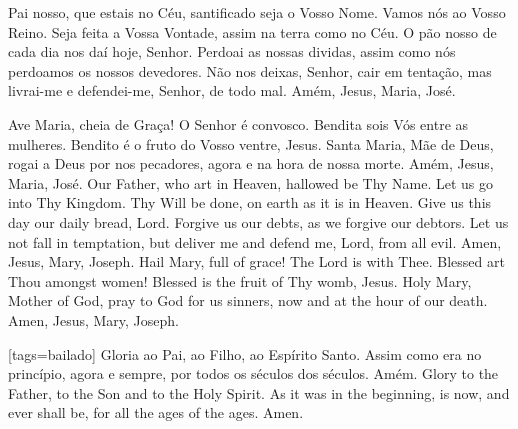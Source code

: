 {\begin{songs}{}
      \beginverse
        \subtitle{Pai nosso}
        Pai nosso,
        que estais no Céu,
        santificado seja o Vosso Nome.
        Vamos nós ao Vosso Reino.
        Seja feita a Vossa Vontade,
        assim na terra como no Céu.
        O pão nosso de cada dia nos daí hoje, Senhor.
        Perdoai as nossas dividas,
        assim como nós perdoamos os nossos devedores.
        Não nos deixas, Senhor, cair em tentação,
        mas livrai-me e defendei-me, Senhor,
        de todo mal.
        \parspace
        Amém, Jesus, Maria, José.
      \endverse
      \beginverse
        \subtitle{Ave Maria}
        Ave Maria,
        cheia de Graça!
        O Senhor é convosco.
        Bendita sois Vós entre as mulheres.
        Bendito é o fruto do Vosso ventre, Jesus.
        Santa Maria, Mãe de Deus,
        rogai a Deus por nos pecadores,
        agora e na hora de nossa morte.
        \parspace
        Amém, Jesus, Maria, José.
      \endverse
      \brk
      \vspace*{\fill}\vspace{-1em}
      \beginverse
        Our Father,
        who art in Heaven,
        hallowed be Thy Name.
        Let us go into Thy Kingdom.
        Thy Will be done,
        on earth as it is in Heaven.
        Give us this day our daily bread, Lord.
        Forgive us our debts,
        as we forgive our debtors.
        Let us not fall in temptation,
        but deliver me and defend me, Lord,
        from all evil.
        \parspace
        Amen, Jesus, Mary, Joseph.
      \endverse
      \beginverse
        Hail Mary,
        full of grace!
        The Lord is with Thee.
        Blessed art Thou amongst women!
        Blessed is the fruit of Thy womb, Jesus.
        Holy Mary, Mother of God,
        pray to God for us sinners,
        now and at the hour of our death.
        \parspace
        Amen, Jesus, Mary, Joseph.
      \endverse
      \vfill
    \endsong


    [tags={bailado}]
      \beginverse
        \parspace
        Gloria ao Pai, ao Filho, ao Espírito Santo.
        Assim como era no princípio, agora e sempre,
        por todos os séculos dos séculos.
        \parspace
        Amém.
      \endverse
      \beginverse
        \parspace
        Glory to the Father, to the Son and to the Holy Spirit.
        As it was in the beginning, is now, and ever shall be,
        for all the ages of the ages.
        \parspace
        Amen.
      \endverse
    \endsong



\end{songs}}
